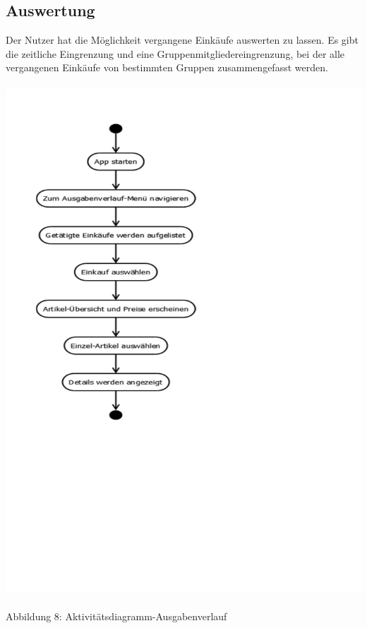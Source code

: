 \documentclass[12pt,a4paper]{article}
\begin{document}
\subsection{Auswertung}
Der Nutzer hat die Möglichkeit vergangene Einkäufe auswerten zu lassen. Es gibt die zeitliche Eingrenzung und eine Gruppenmitgliedereingrenzung, bei der alle vergangenen Einkäufe von bestimmten Gruppen zusammengefasst werden.
\\
\\
\hspace*{-10mm} 
\includegraphics[trim = 17mm 130mm 0mm 20mm, clip, scale=0.9]{Aktiv-Ausgabe.pdf}
\\
\\
\footnotesize Abbildung 8: Aktivitätsdiagramm-Ausgabenverlauf
\normalsize
\\
\newpage
\end{document}
